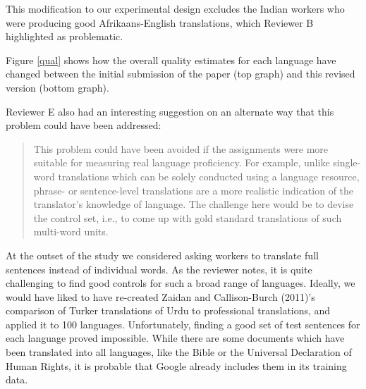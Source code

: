 \documentclass[11pt]{article}
\begin{document}
This modification to our experimental design excludes the Indian workers who were producing good Afrikaans-English translations, which Reviewer B highlighted as problematic.  

Figure \ref{qual} shows how the overall quality estimates for each language have changed between the initial submission of the paper (top graph) and this revised version (bottom graph).


Reviewer E also had an interesting suggestion on an alternate way that this problem could have been addressed:
\begin{quote}
This problem could have been avoided if the assignments were more suitable
for measuring real language proficiency. For example, unlike single-word
translations which can be solely conducted using a language resource,
phrase- or sentence-level translations are a more realistic indication of
the translator's knowledge of language. The challenge here would be to
devise the control set, i.e., to come up with gold standard translations of
such multi-word units. 
\end{quote}
At the outset of the study we considered asking workers to translate full sentences instead of individual words.  As the reviewer notes, it is quite challenging to find good controls for such a broad range of languages.  Ideally, we would have liked to have re-created Zaidan and Callison-Burch (2011)'s comparison of Turker translations of Urdu to professional translations, and applied it to 100 languages.   Unfortunately, finding a good set of test sentences for each language proved impossible.  While there are some documents which have been translated into all languages, like the Bible or the Universal Declaration of Human Rights, it is probable that Google already includes them in its training data. 
\end{document}

